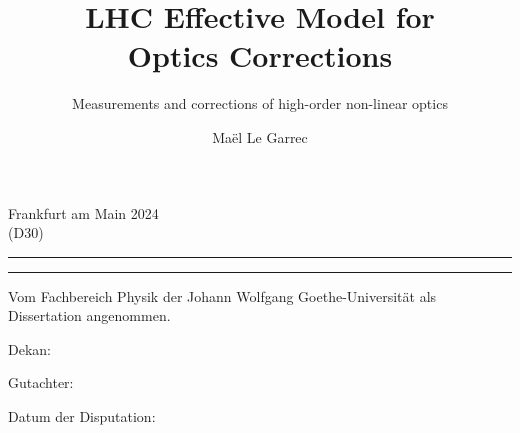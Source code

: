 {{        
        \vfill
        \begin{center}
            Frankfurt am Main 2024\\
            (D30)
        \end{center}

        \noindent\rule[0.5em]{\textwidth}{1.5pt}\vspace{-20pt}
        \noindent\rule[0.5em]{\textwidth}{1.5pt}
    }
    \makeatother
    
    \title{LHC Effective Model for\\Optics Corrections}
    \subtitle{Measurements and corrections of high-order non-linear optics}
    \author{Maël Le Garrec}

    \cleardoublepage
    \makesecondtitle
    \restoregeometry
}


{
    \makeatletter
    \def\makethirdtitle{%
        \thispagestyle{empty} %
        \normalfont\subtitlefont\fontsize{11pt}{15pt}\selectfont%
        
        \begin{flushleft}
            Vom Fachbereich Physik der Johann Wolfgang Goethe-Universität als Dissertation angenommen.
        \end{flushleft}
        \vspace{\vspacesignatures}
        \vspace{\vspacesignatures}

        \noindent Dekan:

        \vspace{\vspacesignatures}
        \noindent Gutachter:

        \vspace{\vspacesignatures}
        \noindent Datum der Disputation:
    }
    \makeatother
    
    \clearpage
    \makethirdtitle
}